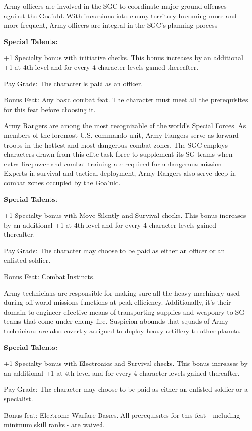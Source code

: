 Army officers are involved in the SGC to coordinate major ground offenses against the Goa'uld. With incursions into enemy territory becoming more and more frequent, Army officers are integral in the SGC's planning process.

\textbf{Special Talents:}
\begin{itemize*}
\item +1 Specialty bonus with initiative checks. This bonus increases by an additional +1 at 4th level and for every 4 character levels gained thereafter.
\item Pay Grade: The character is paid as an officer.
\item Bonus Feat: Any basic combat feat. The character must meet all the prerequisites for this feat before choosing it.
\end{itemize*}

Army Rangers are among the most recognizable of the world's Special Forces. As members of the foremost U.S. commando unit, Army Rangers serve as forward troops in the hottest and most dangerous combat zones. The SGC employs characters drawn from this elite task force to supplement its SG teams when extra firepower and combat training are required for a dangerous mission. Experts in survival and tactical deployment, Army Rangers also serve deep in combat zones occupied by the Goa'uld.

\textbf{Special Talents:}
\begin{itemize*}
\item +1 Specialty bonus with Move Silently and Survival checks. This bonus increases by an additional +1 at 4th level and for every 4 character levels gained thereafter.
\item Pay Grade: The character may choose to be paid as either an officer or an enlisted soldier.
\item Bonus Feat: Combat Instincts.
\end{itemize*}

Army technicians are responsible for making sure all the heavy machinery used during off-world missions functions at peak efficiency. Additionally, it's their domain to engineer effective means of transporting supplies and weaponry to SG teams that come under enemy fire. Suspicion abounds that squads of Army technicians are also covertly assigned to deploy heavy artillery to other planets.

\textbf{Special Talents:}
\begin{itemize*}
\item +1 Specialty bonus with Electronics and Survival checks. This bonus increases by an additional +1 at 4th level and for every 4 character levels gained thereafter.
\item Pay Grade: The character may choose to be paid as either an enlisted soldier or a specialist.
\item Bonus feat: Electronic Warfare Basics. All prerequisites for this feat - including minimum skill ranks - are waived.
\end{itemize*}

